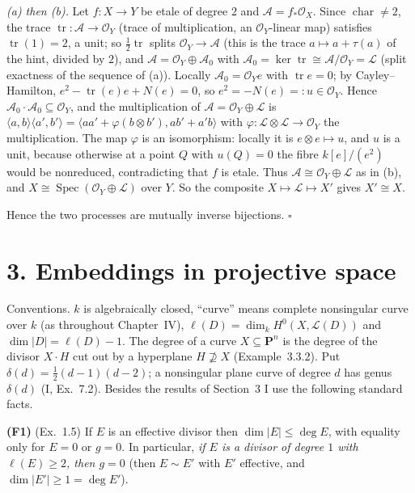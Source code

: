 \documentclass[11pt]{article}
\begin{document}
\emph{(a) then (b).} Let $f:X\to Y$ be etale of degree $2$ and $\mathcal A=f_*\mathcal O_X$. Since $\operatorname{char}\ne2$, the trace $\operatorname{tr}:\mathcal A\to\mathcal O_Y$ (trace of multiplication, an $\mathcal O_Y$-linear map) satisfies $\operatorname{tr}(1)=2$, a unit; so $\frac12\operatorname{tr}$ splits $\mathcal O_Y\to\mathcal A$ (this is the trace $a\mapsto a+\tau(a)$ of the hint, divided by $2$), and $\mathcal A=\mathcal O_Y\oplus\mathcal A_0$ with $\mathcal A_0=\ker\operatorname{tr}\cong\mathcal A/\mathcal O_Y=\mathcal L$ (split exactness of the sequence of (a)). Locally $\mathcal A_0=\mathcal O_Ye$ with $\operatorname{tr}e=0$; by Cayley--Hamilton, $e^2-\operatorname{tr}(e)e+N(e)=0$, so $e^2=-N(e)=:u\in\mathcal O_Y$. Hence $\mathcal A_0\cdot\mathcal A_0\subseteq\mathcal O_Y$, and the multiplication of $\mathcal A=\mathcal O_Y\oplus\mathcal L$ is $\langle a,b\rangle\langle a',b'\rangle=\langle aa'+\varphi(b\otimes b'),ab'+a'b\rangle$ with $\varphi:\mathcal L\otimes\mathcal L\to\mathcal O_Y$ the multiplication. The map $\varphi$ is an isomorphism: locally it is $e\otimes e\mapsto u$, and $u$ is a unit, because otherwise at a point $Q$ with $u(Q)=0$ the fibre $k[e]/(e^2)$ would be nonreduced, contradicting that $f$ is etale. Thus $\mathcal A\cong\mathcal O_Y\oplus\mathcal L$ as in (b), and $X\cong\operatorname{Spec}(\mathcal O_Y\oplus\mathcal L)$ over $Y$. So the composite $X\mapsto\mathcal L\mapsto X'$ gives $X'\cong X$.

Hence the two processes are mutually inverse bijections. \hfill$\square$

\section*{3. Embeddings in projective space}

Conventions. $k$ is algebraically closed, ``curve'' means complete nonsingular curve over $k$ (as throughout Chapter~IV), $\ell(D)=\dim_k H^0(X,\mathcal L(D))$ and $\dim|D|=\ell(D)-1$. The degree of a curve $X\subseteq\mathbf P^n$ is the degree of the divisor $X\cdot H$ cut out by a hyperplane $H\not\supseteq X$ (Example~3.3.2). Put $\delta(d)=\frac12(d-1)(d-2)$; a nonsingular plane curve of degree $d$ has genus $\delta(d)$ (I, Ex.~7.2). Besides the results of Section~3 I use the following standard facts.

\textbf{(F1)} (Ex.~1.5) If $E$ is an effective divisor then $\dim|E|\le\deg E$, with equality only for $E=0$ or $g=0$. In particular, \emph{if $E$ is a divisor of degree $1$ with $\ell(E)\ge2$, then $g=0$} (then $E\sim E'$ with $E'$ effective, and $\dim|E'|\ge1=\deg E'$).
\end{document}
